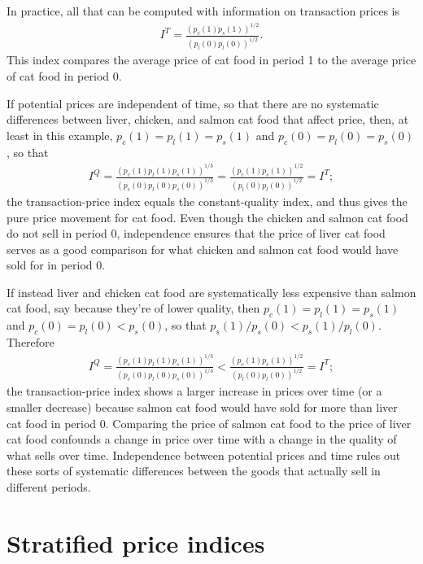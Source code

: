 \documentclass[
]{article}
\begin{document}
In practice, all that can be computed with information on transaction prices is
\begin{align*}
I^{T} = \frac{(p_{c}(1) p_{s}(1))^{1 / 2}}{(p_{l}(0) p_{l}(0))^{1 / 2}}.
\end{align*}
This index compares the average price of cat food in period 1 to the average price of cat food in period 0.

If potential prices are independent of time, so that there are no systematic differences between liver, chicken, and salmon cat food that affect price, then, at least in this example, \(p_{c}(1) = p_{l}(1) = p_{s}(1)\) and \(p_{c}(0) = p_{l}(0) = p_{s}(0)\), so that
\begin{align*}
I^{Q} = \frac{(p_{c}(1) p_{l}(1) p_{s}(1))^{1 / 3}}{(p_{c}(0) p_{l}(0) p_{s}(0))^{1 / 3}} = \frac{(p_{c}(1) p_{s}(1))^{1 / 2}}{(p_{l}(0) p_{l}(0))^{1 / 2}} = I^{T};
\end{align*}
the transaction-price index equals the constant-quality index, and thus gives the pure price movement for cat food. Even though the chicken and salmon cat food do not sell in period 0, independence ensures that the price of liver cat food serves as a good comparison for what chicken and salmon cat food would have sold for in period 0.

If instead liver and chicken cat food are systematically less expensive than salmon cat food, say because they're of lower quality, then \(p_{c}(1) = p_{l}(1) = p_{s}(1)\) and \(p_{c}(0) = p_{l}(0) < p_{s}(0)\), so that \(p_{s}(1) / p_{s}(0) < p_{s}(1) / p_{l}(0)\). Therefore
\begin{align*}
I^{Q} = \frac{(p_{c}(1) p_{l}(1) p_{s}(1))^{1 / 3}}{(p_{c}(0) p_{l}(0) p_{s}(0))^{1 / 3}} < \frac{(p_{c}(1) p_{s}(1))^{1 / 2}}{(p_{l}(0) p_{l}(0))^{1 / 2}} = I^{T};
\end{align*}
the transaction-price index shows a larger increase in prices over time (or a smaller decrease) because salmon cat food would have sold for more than liver cat food in period 0. Comparing the price of salmon cat food to the price of liver cat food confounds a change in price over time with a change in the quality of what sells over time. Independence between potential prices and time rules out these sorts of systematic differences between the goods that actually sell in different periods.

\hypertarget{stratified-price-indices}{%
\section{Stratified price indices}\label{stratified-price-indices}}
\end{document}

